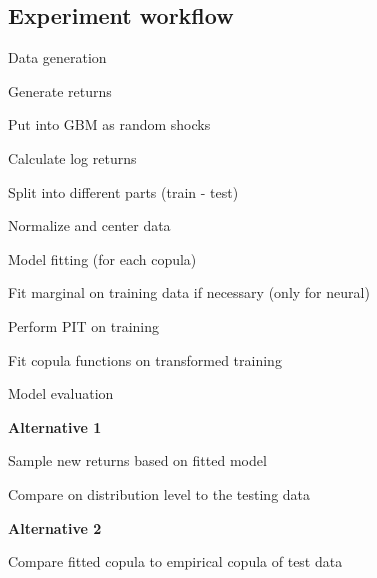 \subsection{Experiment workflow}
\begin{generalinstructions}
    \begin{compactenum}
        \item Data generation
        \begin{compactenum}
            \item Generate returns
            \item Put into GBM as random shocks 
            \item Calculate log returns 
            \item Split into different parts (train - test)
            \item Normalize and center data
        \end{compactenum}
        \item Model fitting (for each copula)
        \begin{compactenum}
            \item Fit marginal on training data if necessary (only for neural) 
            \item Perform PIT on training
            \item Fit copula functions on transformed training
        \end{compactenum}
        \item Model evaluation
        
        \textbf{Alternative 1}
        \begin{compactenum}
            \item Sample new returns based on fitted model
            \item Compare on distribution level to the testing data
        \end{compactenum}
        \textbf{Alternative 2}
        \begin{compactenum}
            \item Compare fitted copula to empirical copula of test data
        \end{compactenum}
    \end{compactenum}
\end{generalinstructions}

